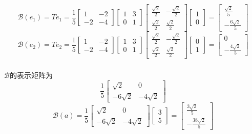 \documentclass[onecolumn,oneside]{SUSTechHomework}
\begin{document}
  \subsubsection{}
  \[
  \mathcal{B}(e_1) = Te_1 =     \frac{1}{5}\begin{bmatrix}
    1 & -2 \\ -2 & -4
  \end{bmatrix}
  \begin{bmatrix}
    1 & 3 \\ 0 & 1
  \end{bmatrix}
  \begin{bmatrix}
    \frac{\sqrt{2}}{2} & -\frac{\sqrt{2}}{2} \\
    \frac{\sqrt{2}}{2} & \frac{\sqrt{2}}{2}
  \end{bmatrix}
  \begin{bmatrix}
    1 \\ 0
  \end{bmatrix}
  = \begin{bmatrix}
    \frac{\sqrt{2}}{5} \\ -\frac{6\sqrt{2}}{5}
  \end{bmatrix}
  \]
  \[
    \mathcal{B}(e_2) = Te_2 =     \frac{1}{5}\begin{bmatrix}
      1 & -2 \\ -2 & -4
    \end{bmatrix}
    \begin{bmatrix}
      1 & 3 \\ 0 & 1
    \end{bmatrix}
    \begin{bmatrix}
      \frac{\sqrt{2}}{2} & -\frac{\sqrt{2}}{2} \\
      \frac{\sqrt{2}}{2} & \frac{\sqrt{2}}{2}
    \end{bmatrix}
    \begin{bmatrix}
      0 \\ 1
    \end{bmatrix}
    = \begin{bmatrix}
      0 \\ -\frac{4\sqrt{2}}{5}
    \end{bmatrix}
  \]
  \subsubsection{}
  \(\mathcal{B}\)的表示矩阵为
  \[  
  \frac{1}{5}\begin{bmatrix}
    \sqrt{2} & 0 \\ -6\sqrt{2} & -4\sqrt{2}
  \end{bmatrix}
  \]
  \[
    \mathcal{B}(a) =   \frac{1}{5}\begin{bmatrix}
      \sqrt{2} & 0 \\ -6\sqrt{2} & -4\sqrt{2}
    \end{bmatrix}
    \begin{bmatrix}
      3 \\ 5
    \end{bmatrix}
     = \begin{bmatrix}
      \frac{3\sqrt{2}}{5} \\ -\frac{38\sqrt{2}}{5}
     \end{bmatrix}
  \]
\end{document}
